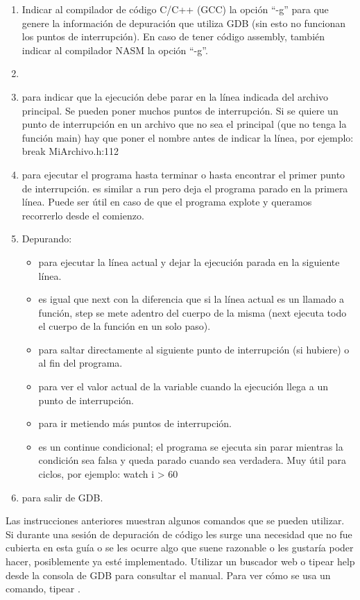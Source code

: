 \begin{enumerate}

\item Indicar al compilador de código C/C++ (GCC) la opción “-g” para que genere la información de depuración que utiliza GDB (sin esto no funcionan los puntos de interrupción). En caso de tener código assembly, también indicar al compilador NASM la opción “-g”.
\item {}
\item {} para indicar que la ejecución debe parar en la línea indicada del archivo principal. Se pueden poner muchos puntos de interrupción.\newline
Si se quiere un punto de interrupción en un archivo que no sea el principal (que no tenga la función main) hay que poner el nombre antes de indicar la línea, por ejemplo: break MiArchivo.h:112
\item {} para ejecutar el programa hasta terminar o hasta encontrar el primer punto de interrupción.\newline
{} es similar a run pero deja el programa parado en la primera línea. Puede ser útil en caso de que el programa explote y queramos recorrerlo desde el comienzo.
\item Depurando:
    \begin{itemize}
    \item {} para ejecutar la línea actual y dejar la ejecución parada en la siguiente línea.
    \item {} es igual que next con la diferencia que si la línea actual es un llamado a función, step se mete adentro del cuerpo de la misma (next ejecuta todo el cuerpo de la función en un solo paso).
    \item {} para saltar directamente al siguiente punto de interrupción (si hubiere) o al fin del programa.
    \item {} para ver el valor actual de la variable cuando la ejecución llega a un punto de interrupción.
    \item {} para ir metiendo más puntos de interrupción.
    \item {} es un continue condicional; el programa se ejecuta sin parar mientras la condición sea falsa y queda parado cuando sea verdadera. Muy útil para ciclos, por ejemplo: watch i > 60
    \end{itemize}
\item {} para salir de GDB.

\end{enumerate}\medskip

Las instrucciones anteriores muestran algunos comandos que se pueden utilizar. Si durante una sesión de depuración de código les surge una necesidad que no fue cubierta en esta guía o se les ocurre algo que suene razonable o les gustaría poder hacer, posiblemente ya esté implementado. Utilizar un buscador web o tipear help desde la consola de GDB para consultar el manual. Para ver cómo se usa un comando, tipear .

